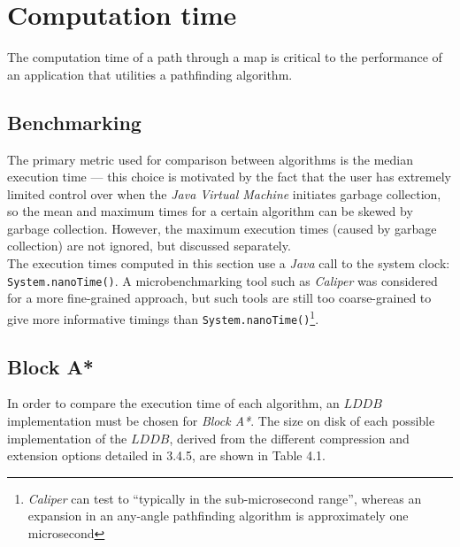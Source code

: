 \documentclass[12pt,notitlepage]{report}
\begin{document}
\section{Computation time}
The computation time of a path through a map is critical to the performance of an application that utilities a pathfinding algorithm.

\subsection{Benchmarking}
The primary metric used for comparison between algorithms is the median execution time --- this choice is motivated by the fact that the user has extremely limited control over when the {\em Java Virtual Machine} initiates garbage collection, so the mean and maximum times for a certain algorithm can be skewed by garbage collection. However, the maximum execution times (caused by garbage collection) are not ignored, but discussed separately.\\

\noindent
The execution times computed in this section use a {\em Java} call to the system clock: {\tt System.nanoTime()}. A microbenchmarking tool such as {\em Caliper}\cite{Caliper} was considered for a more fine-grained approach, but such tools are still too coarse-grained to give more informative timings than {\tt System.nanoTime()}\footnote{{\em Caliper} can test to ``typically in the sub-microsecond range'', whereas an expansion in an any-angle pathfinding algorithm is approximately one microsecond}.

\subsection{Block A*}
In order to compare the execution time of each algorithm, an $LDDB$ implementation must be chosen for {\em Block A*}. The size on disk of each possible implementation of the $LDDB$, derived from the different compression and extension options detailed in 3.4.5, are shown in Table 4.1.\\

\end{document}
